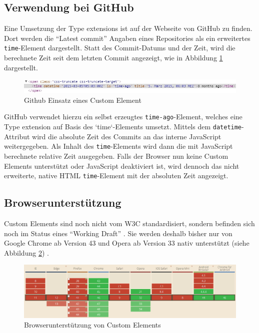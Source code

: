 \subsection{Verwendung bei GitHub}\label{verwendung-bei-github}

Eine Umsetzung der Type extensions ist auf der Webseite von GitHub zu finden. Dort werden die ``Latest commit'' Angaben eines Repositories als ein erweitertes \texttt{time}-Element dargestellt. Statt des Commit-Datums und der Zeit, wird die berechnete Zeit seit dem letzten Commit angezeigt, wie in Abbildung \ref{fig:ghece} dargestellt.

\begin{figure}[htbp]
 \centering
 \includegraphics[width=\linewidth]{kapitel2/bilder/2-custom-elements-github-time-element}
 \caption{Github Einsatz eines Custom Element}
 \label{fig:ghece}
\end{figure}

GitHub verwendet hierzu ein selbst erzeugtes \texttt{time-ago}-Element, welches eine Type extension auf Basis des `time`-Elements umsetzt. Mittels dem \texttt{datetime}-Attribut wird die absolute Zeit des Commits an das interne JavaScript weitergegeben. Als Inhalt des \texttt{time}-Elements wird dann die mit JavaScript berechnete relative Zeit ausgegeben. Falls der Browser nun keine Custom Elements unterstützt oder JavaScript deaktiviert ist, wird dennoch das nicht erweiterte, native HTML \texttt{time}-Element mit der absoluten Zeit angezeigt.


\subsection{Browserunterstützung}\label{custom-elements-browserunterstuetzung}

Custom Elements sind noch nicht vom \ac{W3C} standardisiert, sondern befinden sich noch im Status eines ``Working Draft'' \cite{citeulike:13845061}. Sie werden deshalb bisher nur von Google Chrome ab Version 43 und Opera ab Version 33 nativ unterstützt (siehe Abbildung \ref{fig:buce}) \cite{citeulike:13844983}.

\begin{figure}[htbp]
 \centering
 \includegraphics[width=\linewidth]{kapitel2/bilder/2-custom-elements-browserunterstuetzung}
 \caption{Browserunterstützung von Custom Elements}
 \label{fig:buce}
\end{figure}
